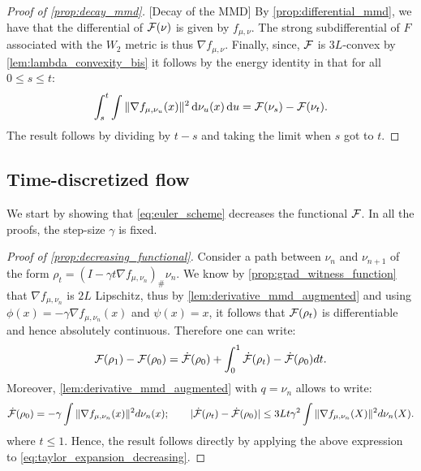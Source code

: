 
\begin{proof}[Proof of \cref{prop:decay_mmd}]\label{proof:prop:decay_mmd}[Decay of the MMD]
By \eqref{prop:differential_mmd}, we have that the differential of ${{\mathcal F}}(\nu)$ is given by $f_{\mu,\nu}$. The strong subdifferential of $F$ associated with the $W_2$ metric is thus $\nabla f_{\mu, \nu}$. Finally, since, ${{\mathcal F}}$ is $3L$-convex by \cref{lem:lambda_convexity_bis} it follows by the energy identity in \cite[Theorem 11.3.2]{ambrosio2008gradient}  that for all $0\leq s\leq t$:
\[
\int_s^t \int \Vert \nabla f_{\mu,\nu_u}(x) \Vert^2\mathop{}\!\mathrm{d} \nu_u(x)\mathop{}\!\mathrm{d} u = {{\mathcal F}}(\nu_s)-{{\mathcal F}}(\nu_t).
\]
The result follows by dividing by $t-s$ and taking the limit when $s$ got to $t$.
\end{proof}




\subsection{Time-discretized flow}\label{appendix:subsec:convegence_time_discrete}
We start by showing that \cref{eq:euler_scheme} decreases the functional ${{\mathcal F}}$. In all the proofs, the step-size $\gamma$ is fixed.

\begin{proof}[Proof of \cref{prop:decreasing_functional}]\label{proof:prop:decreasing_functional}
	Consider a path between $\nu_n$ and $\nu_{n+1}$ of the form $\rho_t	=(I-\gamma t\nabla f_{\mu,\nu_n})_{\#}\nu_n$. We know by \cref{prop:grad_witness_function} that $\nabla f_{\mu,\nu_n}$ is $2L$ Lipschitz, thus by \cref{lem:derivative_mmd_augmented} and using $\phi(x) = -\gamma \nabla f_{\mu,\nu_n}(x)$ and $\psi(x) = x$, it follows that ${{\mathcal F}}(\rho_t)$ is differentiable and hence absolutely continuous. Therefore one can write:
	\begin{align}\label{eq:taylor_expansion_decreasing}
	\mathcal{F}(\rho_1)-\mathcal{F}(\rho_0) = \dot{\mathcal{F}}(\rho_0)+  \int_0^1 \dot{{{\mathcal F}}}(\rho_t)- \dot{{{\mathcal F}}}(\rho_0)dt.
	\end{align}
	Moreover, \cref{lem:derivative_mmd_augmented} with $q=\nu_n$ allows to write:
	\begin{align*}
		\dot{\mathcal{F}}(\rho_0) = -\gamma \int \Vert \nabla f_{\mu,\nu_n}(x) \Vert^2 d\nu_n(x); \qquad \vert \dot{{{\mathcal F}}}(\rho_t)- \dot{{{\mathcal F}}}(\rho_0)\vert \leq 3L t\gamma^2 \int \Vert \nabla f_{\mu,\nu_n}(X) \Vert^2 d\nu_n(X).
	\end{align*}
	where $t\le 1$. Hence, the result follows directly by applying the above expression to \cref{eq:taylor_expansion_decreasing}.
\end{proof}

